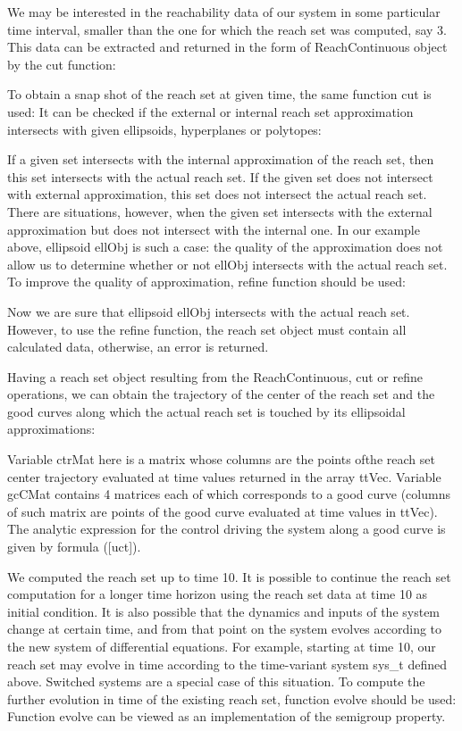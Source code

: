 \documentclass[letterpaper,10pt,english]{sphinxmanual}
\begin{document}
We may be interested in the reachability data of our system in some
particular time interval, smaller than the one for which the reach set
was computed, say 3\leqslantt{}. This data can be
extracted and returned in the form of ReachContinuous object by the cut
function:

To obtain a snap shot of the reach set at given time, the same function
cut is used: It can be checked if the external or internal reach set
approximation intersects with given ellipsoids, hyperplanes or
polytopes:

If a given set intersects with the internal approximation of the reach
set, then this set intersects with the actual reach set. If the given
set does not intersect with external approximation, this set does not
intersect the actual reach set. There are situations, however, when the
given set intersects with the external approximation but does not
intersect with the internal one. In our example above, ellipsoid ellObj
is such a case: the quality of the approximation does not allow us to
determine whether or not ellObj intersects with the actual reach set. To
improve the quality of approximation, refine function should be used:

Now we are sure that ellipsoid ellObj intersects with the actual reach
set. However, to use the refine function, the reach set object must
contain all calculated data, otherwise, an error is returned.

Having a reach set object resulting from the ReachContinuous, cut or
refine operations, we can obtain the trajectory of the center of the
reach set and the good curves along which the actual reach set is
touched by its ellipsoidal approximations:

Variable ctrMat here is a matrix whose columns are the points ofthe
reach set center trajectory evaluated at time values returned in the
array ttVec. Variable gcCMat contains 4 matrices each of which
corresponds to a good curve (columns of such matrix are points of the
good curve evaluated at time values in ttVec). The analytic expression
for the control driving the system along a good curve is given by
formula ({[}uct{]}).

We computed the reach set up to time 10. It is possible to
continue the reach set computation for a longer time horizon using the
reach set data at time 10 as initial condition. It is also
possible that the dynamics and inputs of the system change at certain
time, and from that point on the system evolves according to the new
system of differential equations. For example, starting at time
10, our reach set may evolve in time according to the
time-variant system sys\_t defined above. Switched systems are a special
case of this situation. To compute the further evolution in time of the
existing reach set, function evolve should be used: Function evolve can
be viewed as an implementation of the semigroup property.
\end{document}
